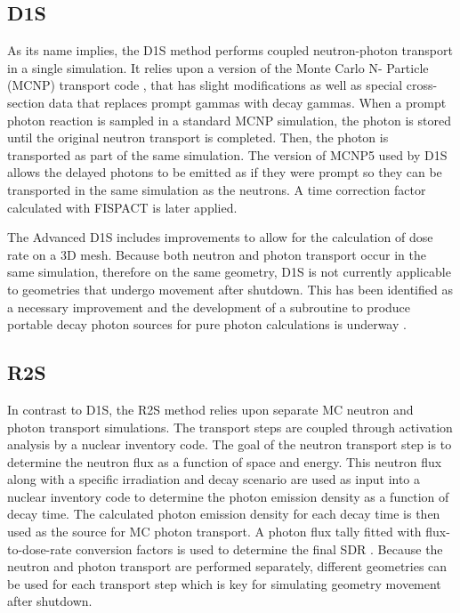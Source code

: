 \subsection{D1S}
As its name implies, the D1S method performs coupled neutron-photon transport
in a single simulation.  It relies upon a version of the Monte Carlo N-
Particle (MCNP) transport code \cite{mcnp_manual}, that has slight modifications as well as special 
cross-section data that replaces prompt gammas with decay gammas.
When a prompt photon reaction is sampled in a standard MCNP simulation,
the photon is stored until the original neutron transport is
completed. Then, the photon is transported as part of the same simulation.
The version of MCNP5 used by D1S 
allows the delayed 
photons to be emitted as if they were prompt so they can be transported in the
same simulation
as the neutrons. A time correction factor calculated with FISPACT \cite{fispact} is later applied.

The Advanced D1S \cite{adv-d1s} includes improvements to allow for the
calculation of dose rate on a 3D mesh.
Because both neutron and photon transport occur in the same simulation,
therefore on the same geometry, D1S
is not currently applicable to geometries that undergo movement after shutdown.
This has been identified as a necessary improvement and the development of a
subroutine to produce portable decay photon sources for pure photon
calculations is underway \cite{adv-d1s}. 

\subsection{R2S}\label{sec:r2s}
In contrast to D1S, the R2S method relies upon separate MC neutron and photon
transport simulations.  The transport steps are coupled through activation analysis 
by a nuclear inventory code.
The goal of the neutron transport step is to determine the neutron flux
as a function of space and energy.  This neutron flux along with a specific irradiation
and decay scenario are used as input into a nuclear inventory
code to determine the photon emission density as a function of decay time.
The calculated photon emission density for each decay time
is then used as the source for MC photon transport.  A photon flux tally
fitted with flux-to-dose-rate conversion factors is used to
determine the final SDR \cite{r2s}.
Because the neutron and photon transport are performed separately,
different geometries can be used for each transport step which is key for
simulating geometry movement after shutdown.
